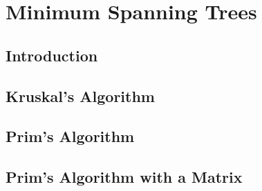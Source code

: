 \documentclass[../alevelmaths.tex]{subfiles}
\begin{document}
\chapter{Minimum Spanning Trees}
\section{Introduction}
\section{Kruskal's Algorithm}
\section{Prim's Algorithm}
\section{Prim's Algorithm with a Matrix}
\end{document}
